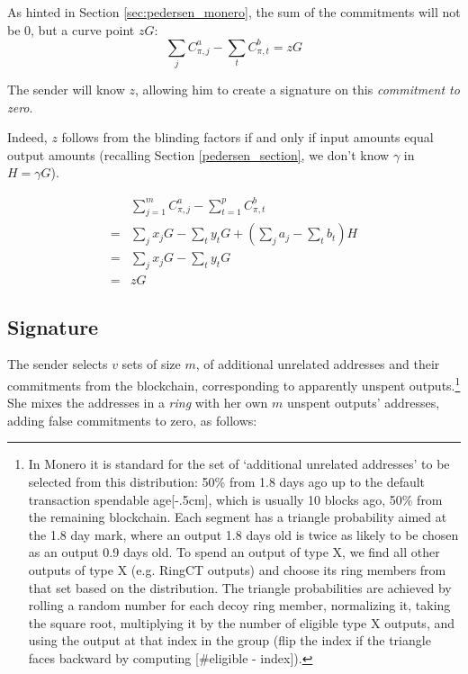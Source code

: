 As hinted in Section \ref{sec:pedersen_monero}, the sum of the commitments will not be 0, but a curve point $z G$:\\
\[\sum\limits_j C^a_{\pi, j} -\sum\limits_t C^b_{\pi, t} = z G  \]

The sender will know $z$, allowing him to create a signature on this {\em commitment to zero}.

Indeed, $z$ follows from the blinding factors if and only if input amounts equal output amounts (recalling Section \ref{pedersen_section}, we don’t know $\gamma$ in $H = \gamma G$).


\begin{align*}
& \sum\limits_{j=1}^m C^a_{\pi, j} - \sum\limits_{t=1}^p C^b_{\pi, t} \\
= & \sum\limits_j x_j G - \sum\limits_t y_t G + (\sum\limits_j  a_j - \sum\limits_t  b_t) H\\
= & \sum\limits_j x_j G - \sum\limits_t y_t G \\
= & z G
\end{align*}




\subsection{Signature}
\label{full-signature}



The sender selects $v$ sets of size $m$, of additional unrelated addresses and their commitments from the blockchain, corresponding to apparently unspent outputs.\footnote{\label{input-selection}In Monero it is standard for the set of `additional unrelated addresses' to be selected from this distribution: 50\% from 1.8 days ago up to the default transaction spendable age[-.5cm], which is usually 10 blocks ago, 50\% from the remaining blockchain. Each segment has a triangle probability aimed at the 1.8 day mark, where an output 1.8 days old is twice as likely to be chosen as an output 0.9 days old. To spend an output of type X, we find all other outputs of type X (e.g. RingCT outputs) and choose its ring members from that set based on the distribution. The triangle probabilities are achieved by rolling a random number for each decoy ring member, normalizing it, taking the square root, multiplying it by the number of eligible type X outputs, and using the output at that index in the group (flip the index if the triangle faces backward by computing [\#eligible - index]).} She mixes the addresses in a {\em ring} with her own $m$ unspent outputs' addresses, adding false commitments to zero, as follows:

